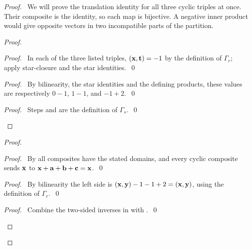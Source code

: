 \begin{proof}
 \pfsketch\ We will prove the translation identity for all three cyclic triples at once.
 Their composite is the identity, so each map is bijective. A negative inner product would
 give opposite vectors in two incompatible parts of the partition.
 \begin{proof}
  \begin{proof}
   \pf\ In each of the three listed triples, $({\mathbf x},{\mathbf t})=-1$ by the definition of
   $\Gamma_r$; apply star-closure and the star identities.~\qed
  \end{proof}
  \begin{proof}
   \pf\ By bilinearity, the star identities and the defining products, these values are respectively
   $0-1$, $1-1$, and $-1+2$.~\qed
  \end{proof}
  \qedstep
  \begin{proof}\pf\ Steps  and  are the definition of $\Gamma_s$.~\qed\end{proof}
 \end{proof}
 \begin{proof}
  \begin{proof}
   \pf\ By  all composites have the stated domains, and every cyclic
   composite sends ${\mathbf x}$ to ${\mathbf x}+{\mathbf a}+{\mathbf b}+{\mathbf c}={\mathbf x}$.~\qed
  \end{proof}
  \begin{proof}
   \pf\ By bilinearity the left side is $({\mathbf x},{\mathbf y})-1-1+2=({\mathbf x},{\mathbf y})$,
   using the definition of $\Gamma_r$.~\qed
  \end{proof}
  \qedstep
  \begin{proof}\pf\ Combine the two-sided inverses in  with .~\qed\end{proof}
 \end{proof}
\end{proof}
